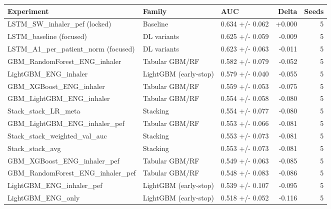 \begin{tabular}{lllrr}
\toprule
Experiment & Family & AUC & Delta & Seeds \\
\midrule
LSTM\_SW\_inhaler\_pef (locked) & Baseline & 0.634 +/- 0.062 & +0.000 & 5 \\
LSTM\_baseline (focused) & DL variants & 0.625 +/- 0.059 & -0.009 & 5 \\
LSTM\_A1\_per\_patient\_norm (focused) & DL variants & 0.623 +/- 0.063 & -0.011 & 5 \\
GBM\_RandomForest\_ENG\_inhaler & Tabular GBM/RF & 0.582 +/- 0.079 & -0.052 & 5 \\
LightGBM\_ENG\_inhaler & LightGBM (early-stop) & 0.579 +/- 0.040 & -0.055 & 5 \\
GBM\_XGBoost\_ENG\_inhaler & Tabular GBM/RF & 0.559 +/- 0.053 & -0.075 & 5 \\
GBM\_LightGBM\_ENG\_inhaler & Tabular GBM/RF & 0.554 +/- 0.058 & -0.080 & 5 \\
Stack\_stack\_LR\_meta & Stacking & 0.554 +/- 0.077 & -0.080 & 5 \\
GBM\_LightGBM\_ENG\_inhaler\_pef & Tabular GBM/RF & 0.553 +/- 0.066 & -0.081 & 5 \\
Stack\_stack\_weighted\_val\_auc & Stacking & 0.553 +/- 0.073 & -0.081 & 5 \\
Stack\_stack\_avg & Stacking & 0.553 +/- 0.073 & -0.081 & 5 \\
GBM\_XGBoost\_ENG\_inhaler\_pef & Tabular GBM/RF & 0.549 +/- 0.063 & -0.085 & 5 \\
GBM\_RandomForest\_ENG\_inhaler\_pef & Tabular GBM/RF & 0.548 +/- 0.083 & -0.086 & 5 \\
LightGBM\_ENG\_inhaler\_pef & LightGBM (early-stop) & 0.539 +/- 0.107 & -0.095 & 5 \\
LightGBM\_ENG\_only & LightGBM (early-stop) & 0.518 +/- 0.052 & -0.116 & 5 \\
\bottomrule
\end{tabular}
